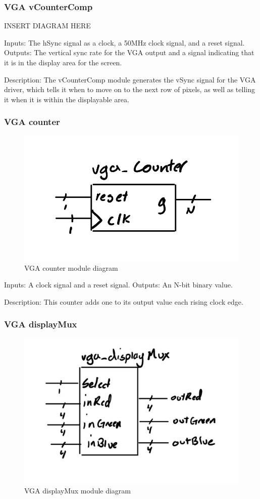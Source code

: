 \documentclass[a4paper]{article}
\begin{document}
\subsubsection{VGA vCounterComp}

INSERT DIAGRAM HERE

Inputs: The hSync signal as a clock, a 50MHz clock signal, and a reset signal.
Outputs: The vertical sync rate for the VGA output and a signal indicating that it is in the display area for the screen.

Description: The vCounterComp module generates the vSync signal for the VGA driver, which tells it when to move on to the next row of pixels, as well as telling it when it is within the displayable area.

\subsubsection{VGA counter}

\begin{figure}[H]
    \includegraphics[width=0.8 \linewidth]{images/vgacounter.JPG}
    \caption{VGA counter module diagram}
    \label{vgaCounterDiagram}
\end{figure}

Inputs: A clock signal and a reset signal.
Outputs: An N-bit binary value.

Description: This counter adds one to its output value each rising clock edge.

\subsubsection{VGA displayMux}

\begin{figure}[H]
    \includegraphics[width=0.8 \linewidth]{images/vgadisplayMux.JPG}
    \caption{VGA displayMux module diagram}
    \label{vgaDisplayMuxDiagram}
\end{figure}
\end{document}
